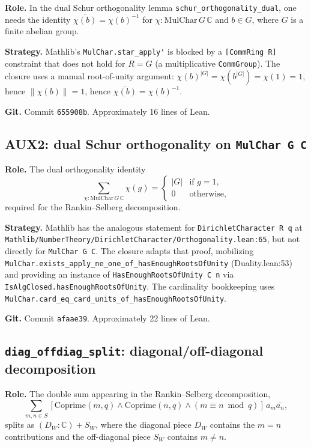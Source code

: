 \documentclass[11pt,a4paper]{article}
\theoremstyle{definition}
\newcommand{\DWq}{D_W}
\newcommand{\SWq}{S_W}
\begin{document}
\textbf{Role.} In the dual Schur orthogonality lemma \verb|schur_orthogonality_dual|, one needs the identity $\overline{\chi(b)} = \chi(b)^{-1}$ for $\chi : \mathrm{MulChar}\,G\,\mathbb{C}$ and $b \in G$, where $G$ is a finite abelian group.

\textbf{Strategy.} Mathlib's \verb|MulChar.star_apply'| is blocked by a \verb|[CommRing R]| constraint that does not hold for $R = G$ (a multiplicative \verb|CommGroup|). The closure uses a manual root-of-unity argument: $\chi(b)^{|G|} = \chi(b^{|G|}) = \chi(1) = 1$, hence $\|\chi(b)\| = 1$, hence $\overline{\chi(b)} = \chi(b)^{-1}$.

\textbf{Git.} Commit \verb|655908b|. Approximately 16 lines of Lean.

\subsection{AUX2: dual Schur orthogonality on \texttt{MulChar G C}}

\textbf{Role.} The dual orthogonality identity
\[
  \sum_{\chi : \mathrm{MulChar}\,G\,\mathbb{C}} \chi(g) =
  \begin{cases} |G| & \text{if } g = 1, \\ 0 & \text{otherwise,}\end{cases}
\]
required for the Rankin--Selberg decomposition.

\textbf{Strategy.} Mathlib has the analogous statement for \verb|DirichletCharacter R q| at \verb|Mathlib/NumberTheory/DirichletCharacter/Orthogonality.lean:65|, but not directly for \verb|MulChar G C|. The closure adapts that proof, mobilizing \verb|MulChar.exists_apply_ne_one_of_hasEnoughRootsOfUnity| (Duality.lean:53) and providing an instance of \verb|HasEnoughRootsOfUnity C n| via \verb|IsAlgClosed.hasEnoughRootsOfUnity|. The card\-inality bookkeeping uses \verb|MulChar.card_eq_card_units_of_hasEnoughRootsOfUnity|.

\textbf{Git.} Commit \verb|afaae39|. Approximately 22 lines of Lean.

\subsection{\texttt{diag\_offdiag\_split}: diagonal/off-diagonal decomposition}

\textbf{Role.} The double sum appearing in the Rankin--Selberg decomposition,
\[
  \sum_{m,n \in S}\!\![\mathrm{Coprime}(m,q) \wedge \mathrm{Coprime}(n,q) \wedge (m \equiv n \bmod q)]\,a_m \overline{a_n},
\]
splits as $(\DWq : \mathbb{C}) + \SWq$, where the diagonal piece $\DWq$ contains the $m = n$ contributions and the off-diagonal piece $\SWq$ contains $m \neq n$.
\end{document}
